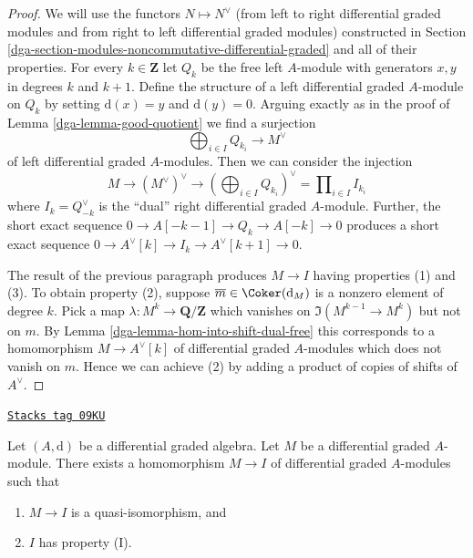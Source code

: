 \begin{proof}

We will use the functors $N \mapsto N^\vee$ (from left to right
differential graded modules and from right to left differential
graded modules) constructed in
Section \ref{dga-section-modules-noncommutative-differential-graded}
and all of their properties.
For every $k \in \mathbf{Z}$ let $Q_k$ be the free left $A$-module with
generators $x, y$ in degrees $k$ and $k + 1$. Define the structure of a
left differential graded $A$-module on $Q_k$ by setting $\text{d}(x) = y$
and $\text{d}(y) = 0$. Arguing exactly as in the proof of
Lemma \ref{dga-lemma-good-quotient} we find a surjection
$$
\bigoplus\nolimits_{i \in I} Q_{k_i} \longrightarrow M^\vee
$$
of left differential graded $A$-modules. Then we can consider the injection
$$
M \to (M^\vee)^\vee \to (\bigoplus\nolimits_{i \in I} Q_{k_i})^\vee =
\prod\nolimits_{i \in I} I_{k_i}
$$
where $I_k = Q_{-k}^\vee$ is the ``dual'' right differential graded $A$-module.
Further, the short exact sequence $0 \to A[-k - 1] \to Q_k \to A[-k] \to 0$
produces a short exact sequence
$0 \to A^\vee[k] \to I_k \to A^\vee[k + 1] \to 0$.

\medskip\noindent
The result of the previous paragraph produces $M \to I$
having properties (1) and (3). To obtain property (2), suppose
$\overline{m} \in \Coker(\text{d}_M)$ is a nonzero element of
degree $k$. Pick a map $\lambda : M^k \to \mathbf{Q}/\mathbf{Z}$
which vanishes on $\Im(M^{k - 1} \to M^k)$ but not on $m$. By
Lemma \ref{dga-lemma-hom-into-shift-dual-free}
this corresponds to a homomorphism $M \to A^\vee[k]$ of
differential graded $A$-modules which does not vanish on $m$.
Hence we can achieve (2) by adding
a product of copies of shifts of $A^\vee$.
\end{proof}

\begin{lemma}
\label{dga-lemma-right-resolution}
\href{https://stacks.math.columbia.edu/tag/09KU}{\texttt{Stacks tag 09KU}}

Let $(A, \text{d})$ be a differential graded algebra.
Let $M$ be a differential graded $A$-module. There exists a homomorphism
$M \to I$ of differential graded $A$-modules such that
\begin{enumerate}
\item $M \to I$ is a quasi-isomorphism, and
\item $I$ has property (I).
\end{enumerate}
\end{lemma}


